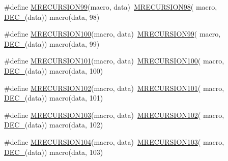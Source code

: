 \begin{DoxyCompactItemize}
\item 
\#define \mbox{\hyperlink{group__group__sam0__utils__mrecursion_ga49ea729b9d1196d0bb2b9d35834bdcd8}{M\+R\+E\+C\+U\+R\+S\+I\+O\+N99}}(macro,  data)~\mbox{\hyperlink{group__group__sam0__utils__mrecursion_ga09220b4e632b8d49bf826fee3f9235c7}{M\+R\+E\+C\+U\+R\+S\+I\+O\+N98}}(  macro, \mbox{\hyperlink{group__group__sam0__utils__mrecursion_ga1d23d683797679dca8c3512a54a5dcae}{D\+E\+C\+\_\+}}(data))   macro(data, 98)
\item 
\#define \mbox{\hyperlink{group__group__sam0__utils__mrecursion_ga858f2b3d9b3437edb4fc4fd519c4fee7}{M\+R\+E\+C\+U\+R\+S\+I\+O\+N100}}(macro,  data)~\mbox{\hyperlink{group__group__sam0__utils__mrecursion_ga49ea729b9d1196d0bb2b9d35834bdcd8}{M\+R\+E\+C\+U\+R\+S\+I\+O\+N99}}(  macro, \mbox{\hyperlink{group__group__sam0__utils__mrecursion_ga1d23d683797679dca8c3512a54a5dcae}{D\+E\+C\+\_\+}}(data))   macro(data, 99)
\item 
\#define \mbox{\hyperlink{group__group__sam0__utils__mrecursion_gae895878fcdbb1862624dd17835337f7e}{M\+R\+E\+C\+U\+R\+S\+I\+O\+N101}}(macro,  data)~\mbox{\hyperlink{group__group__sam0__utils__mrecursion_ga858f2b3d9b3437edb4fc4fd519c4fee7}{M\+R\+E\+C\+U\+R\+S\+I\+O\+N100}}(  macro, \mbox{\hyperlink{group__group__sam0__utils__mrecursion_ga1d23d683797679dca8c3512a54a5dcae}{D\+E\+C\+\_\+}}(data))   macro(data, 100)
\item 
\#define \mbox{\hyperlink{group__group__sam0__utils__mrecursion_gae7ed0e33ac140200e71c2a57234c08aa}{M\+R\+E\+C\+U\+R\+S\+I\+O\+N102}}(macro,  data)~\mbox{\hyperlink{group__group__sam0__utils__mrecursion_gae895878fcdbb1862624dd17835337f7e}{M\+R\+E\+C\+U\+R\+S\+I\+O\+N101}}(  macro, \mbox{\hyperlink{group__group__sam0__utils__mrecursion_ga1d23d683797679dca8c3512a54a5dcae}{D\+E\+C\+\_\+}}(data))   macro(data, 101)
\item 
\#define \mbox{\hyperlink{group__group__sam0__utils__mrecursion_ga387fb40ce19de11aa90d6aa2a331110f}{M\+R\+E\+C\+U\+R\+S\+I\+O\+N103}}(macro,  data)~\mbox{\hyperlink{group__group__sam0__utils__mrecursion_gae7ed0e33ac140200e71c2a57234c08aa}{M\+R\+E\+C\+U\+R\+S\+I\+O\+N102}}(  macro, \mbox{\hyperlink{group__group__sam0__utils__mrecursion_ga1d23d683797679dca8c3512a54a5dcae}{D\+E\+C\+\_\+}}(data))   macro(data, 102)
\item 
\#define \mbox{\hyperlink{group__group__sam0__utils__mrecursion_ga25a6fddabb19c7e2b9d332ca28726ab8}{M\+R\+E\+C\+U\+R\+S\+I\+O\+N104}}(macro,  data)~\mbox{\hyperlink{group__group__sam0__utils__mrecursion_ga387fb40ce19de11aa90d6aa2a331110f}{M\+R\+E\+C\+U\+R\+S\+I\+O\+N103}}(  macro, \mbox{\hyperlink{group__group__sam0__utils__mrecursion_ga1d23d683797679dca8c3512a54a5dcae}{D\+E\+C\+\_\+}}(data))   macro(data, 103)

\end{DoxyCompactItemize}
